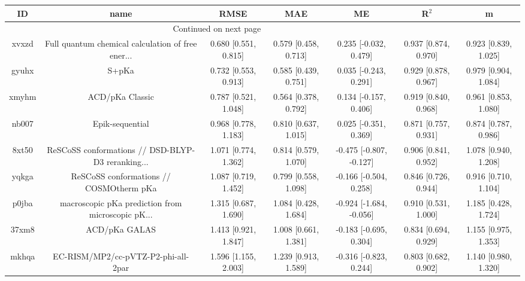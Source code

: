 \documentclass{article}
\begin{document}
\begin{center}
\begin{longtable}{|ccccccc|}
\toprule
    ID &                                               name &                  RMSE &                   MAE &                       ME &                 R$^2$ &                      m \\
\midrule
\endhead
\midrule
\multicolumn{3}{r}{{Continued on next page}} \\
\midrule
\endfoot

\bottomrule
\endlastfoot
 xvxzd &  Full quantum chemical calculation of free ener... &  0.680 [0.551, 0.815] &  0.579 [0.458, 0.713] &    0.235 [-0.032, 0.479] &  0.937 [0.874, 0.970] &   0.923 [0.839, 1.025] \\
 gyuhx &                                              S+pKa &  0.732 [0.553, 0.913] &  0.585 [0.439, 0.751] &    0.035 [-0.243, 0.291] &  0.929 [0.878, 0.967] &   0.979 [0.904, 1.084] \\
 xmyhm &                                    ACD/pKa Classic &  0.787 [0.521, 1.048] &  0.564 [0.378, 0.792] &    0.134 [-0.157, 0.406] &  0.919 [0.840, 0.968] &   0.961 [0.853, 1.080] \\
 nb007 &                                    Epik-sequential &  0.968 [0.778, 1.183] &  0.810 [0.637, 1.015] &    0.025 [-0.351, 0.369] &  0.871 [0.757, 0.931] &   0.874 [0.787, 0.986] \\
 8xt50 &  ReSCoSS conformations // DSD-BLYP-D3 reranking... &  1.071 [0.774, 1.362] &  0.814 [0.579, 1.070] &  -0.475 [-0.807, -0.127] &  0.906 [0.841, 0.952] &   1.078 [0.940, 1.208] \\
 yqkga &            ReSCoSS conformations // COSMOtherm pKa &  1.087 [0.719, 1.452] &  0.799 [0.558, 1.098] &   -0.166 [-0.504, 0.258] &  0.846 [0.726, 0.944] &   0.916 [0.710, 1.104] \\
 p0jba &  macroscopic pKa prediction from microscopic pK... &  1.315 [0.687, 1.690] &  1.084 [0.428, 1.684] &  -0.924 [-1.684, -0.056] &  0.910 [0.531, 1.000] &   1.185 [0.428, 1.724] \\
 37xm8 &                                      ACD/pKa GALAS &  1.413 [0.921, 1.847] &  1.008 [0.661, 1.381] &   -0.183 [-0.695, 0.304] &  0.834 [0.694, 0.929] &   1.155 [0.975, 1.353] \\
 mkhqa &                EC-RISM/MP2/cc-pVTZ-P2-phi-all-2par &  1.596 [1.155, 2.003] &  1.239 [0.913, 1.589] &   -0.316 [-0.823, 0.244] &  0.803 [0.682, 0.902] &   1.140 [0.980, 1.320] \\

\end{longtable}
\end{center}
\end{document}

